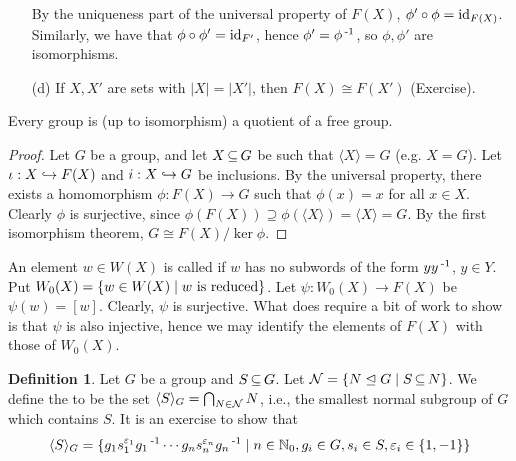 \documentclass[11pt]{book}
\theoremstyle{definition}   \newtheorem{defn}[counter]{Definition} %
\newcommand{\nsg}{\mathrel{\unlhd}}   \newcommand{\ind}{\parindent24pt}   \newcommand{\vn}{\varnothing}
\newcommand{\ve}{\varepsilon}   \newcommand{\im}{\textnormal{im }}   \newcommand{\re}{\textnormal{Re }}   \newcommand{\mb}[1]{\mathbf{#1}}
\newcommand{\gen}[1]{\langle #1 \rangle}   \newcommand{\stab}[2]{\tn{Stab}_{#1}(#2)}   \newcommand{\fix}[2]{\tn{Fix}_{#1}(#2)}
\DeclareMathOperator{\ra}{\rightarrow}   \DeclareMathOperator{\Poly}{\mathbf{P}}   \DeclareMathOperator{\spn}{\textnormal{span}}   \DeclareMathOperator{\aut}{\textnormal{Aut}}
\newcommand{\vs}{\vspace{8pt}}
\numberwithin{counter}{chapter}
\begin{document}
\begin{remark}
\begin{enumerate}
By the uniqueness part of the universal property of $F(X)$, $\phi' \circ \phi = \textnormal{id}_{F(X)}$. Similarly, we have that $\phi \circ \phi' = \textnormal{id}_{F'}$, hence $\phi' = \phi\operatorname{^{-1}}$, so $\phi, \phi'$ are isomorphisms.

\item[(d)] If $X,X'$ are sets with $|X| = |X'|$, then $F(X) \cong F(X')$ (Exercise).
\end{enumerate}
\end{remark}

\vs

\begin{corollary}
Every group is (up to isomorphism) a quotient of a free group.
\end{corollary}

\begin{proof}
Let $G$ be a group, and let $X \operatorname{\subseteq} G$ be such that $\gen{X} = G$ (e.g. $X = G$). Let $\iota : X \hookrightarrow F(X)$ and $i : X \hookrightarrow G$ be inclusions. By the universal property, there exists a homomorphism $\phi : F(X) \ra G$ such that $\phi(x) = x$ for all $x \in X$. Clearly $\phi$ is surjective, since $\phi(F(X)) \supseteq \phi(\gen{X}) = \gen{X} = G$. By the first isomorphism theorem, $G \cong F(X) / \ker \phi$.
\end{proof}

\vs

\begin{remark}
An element $w \in W(X)$ is called  if $w$ has no subwords of the form $y y\operatorname{^{-1}}$, $y \in Y$. Put $W_0(X) = \{ w \in W(X) \mid w \textnormal{ is reduced}\}$. Let $\psi : W_0(X) \ra F(X)$ be $\psi(w) = [w]$. Clearly, $\psi$ is surjective. What does require a bit of work to show is that $\psi$ is also injective, hence we may identify the elements of $F(X)$ with those of $W_0(X)$.
\end{remark}

\vs

\begin{defn}
Let $G$ be a group and $S \operatorname{\subseteq} G$. Let $\mc{N} = \{N \nsg G \mid S \sub N\}$. We define the \tb{normal closure of $\mb{S}$ in $\mb{G}$} to be the set $\gen{S}_G = \bigcap_{N \in \mc{N}} N$, i.e., the smallest normal subgroup of $G$ which contains $S$. It is an exercise to show that
	\[\gen{S}_G = \{g_1s_1^{\ve_1}g_1\inv \cdots g_n s_n^{\ve_n} g_n\inv \mid n \in \N_0, g_i \in G, s_i \in S, \ve_i \in \{1,-1\}\} \]
\end{defn}
\end{document}
